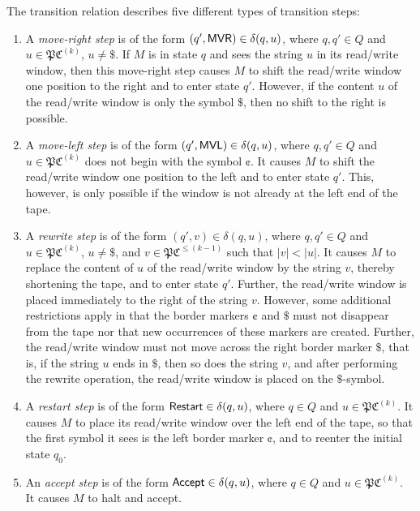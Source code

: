The transition relation describes five different types of transition steps:

\begin{enumerate}
\item A \emph{move-right step} is of the form \index{$\MVR$}$(q', \textup{\sf MVR}) \in \delta(q, u)$, where $q, q' \in Q$ and $u \in \mathfrak{PC}^{(k)}$, $u \neq \$$. If $M$ is in state $q$ and sees the string $u$ in its read/write window, then this move-right step causes $M$ to shift the read/write window one position to the right and to enter state $q'$. However, if the content $u$ of the read/write window is only the symbol $\$$, then no shift to the right is possible.
\item A \emph{move-left step} is of the form \index{$\MVL$}$(q', \textup{\sf MVL}) \in \delta(q, u)$, where $q, q' \in Q$ and $u \in \mathfrak{PC}^{(k)}$ does not begin with the symbol $\cent$. It causes $M$ to shift the read/write window one position to the left and to enter state $q'$. This, however, is only possible if the window is not already at the left end of the tape.
\item A \emph{rewrite step} is of the form $(q', v) \in \delta(q, u)$, where $q, q' \in Q$ and $u \in \mathfrak{PC}^{(k)}$, $u \neq \$$, and $v \in \mathfrak{PC}^{\le (k-1)}$ such that $|v| < |u|$. It causes $M$ to replace the content of $u$ of the read/write window by the string $v$, thereby shortening the tape, and to enter state $q'$. Further, the read/write window is placed immediately to the right of the string $v$. However, some additional restrictions apply in that the border markers  $\cent$ and $\$$ must not disappear from the tape nor that new occurrences of these markers are created. Further, the read/write window must not move across the right border marker $\$$, that is, if the string $u$ ends in $\$$, then so does the string $v$, and after performing the rewrite operation, the read/write window is placed on the $\$$-symbol.
\item A \emph{restart step} is of the form \index{$\Restart$}$\textup{\sf Restart} \in \delta(q, u)$, where $q \in Q$ and $u \in \mathfrak{PC}^{(k)}$. It causes $M$ to place its read/write window over the left end of the tape, so that the first symbol it sees is the left border marker $\cent$, and to reenter the initial state $q_0$.
\item An \emph{accept step} is of the form \index{$\Accept$}$\textup{\sf Accept} \in \delta(q, u)$, where $q \in Q$ and $u \in \mathfrak{PC}^{(k)}$. It causes $M$ to halt and accept.
\end{enumerate}

